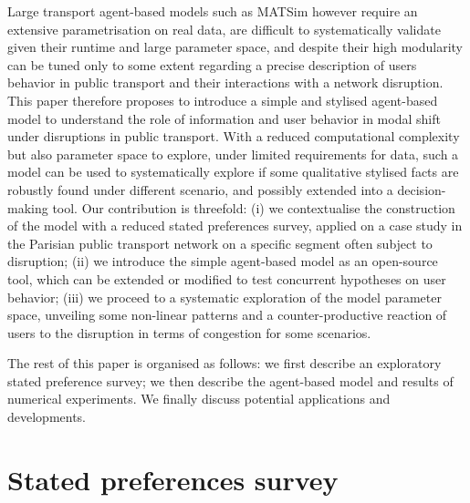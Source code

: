 \documentclass[3p,times,procedia]{elsarticle}
\begin{document}
Large transport agent-based models such as MATSim however require an extensive parametrisation on real data, are difficult to systematically validate given their runtime and large parameter space, and despite their high modularity can be tuned only to some extent regarding a precise description of users behavior in public transport and their interactions with a network disruption. This paper therefore proposes to introduce a simple and stylised agent-based model to understand the role of information and user behavior in modal shift under disruptions in public transport. With a reduced computational complexity but also parameter space to explore, under limited requirements for data, such a model can be used to systematically explore if some qualitative stylised facts are robustly found under different scenario, and possibly extended into a decision-making tool. Our contribution is threefold: (i) we contextualise the construction of the model with a reduced stated preferences survey, applied on a case study in the Parisian public transport network on a specific segment often subject to disruption; (ii) we introduce the simple agent-based model as an open-source tool, which can be extended or modified to test concurrent hypotheses on user behavior; (iii) we proceed to a systematic exploration of the model parameter space, unveiling some non-linear patterns and a counter-productive reaction of users to the disruption in terms of congestion for some scenarios.

The rest of this paper is organised as follows: we first describe an exploratory stated preference survey; we then describe the agent-based model and results of numerical experiments. We finally discuss potential applications and developments.


\section{Stated preferences survey}

\end{document}
